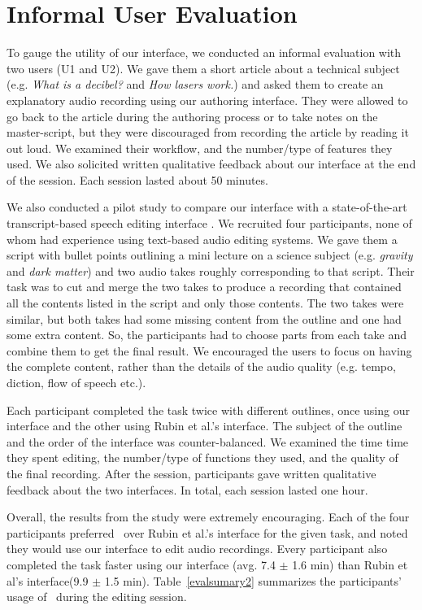 \section{Informal User Evaluation}
To gauge the utility of our interface, we conducted an informal evaluation with two users (U1 and U2). We gave them a short article about a technical subject (e.g. \textit{What is a decibel?} and \textit{How lasers work.}) and asked them to create an explanatory audio recording using our authoring interface. They were allowed to go back to the article during the authoring process or to take notes on the master-script, but they were discouraged from recording the article by reading it out loud. We examined their workflow, and the number/type of features they used. We also solicited written qualitative feedback about our interface at the end of the session. Each session lasted about 50 minutes.




We also conducted a pilot study to compare our interface with a state-of-the-art transcript-based speech editing interface \cite{rubin2013content}. We recruited four participants, none of whom had experience using text-based audio editing systems. We gave them a script with bullet points outlining a mini lecture on a science subject (e.g. \textit{gravity} and \textit{dark matter}) and two audio takes roughly corresponding to that script. Their task was to cut and merge the two takes to produce a recording that contained all the contents listed in the script and only those contents. The two takes were similar, but both takes had some
missing content from the outline and one had some extra
content. So, the participants had to choose parts from each take and combine them to get the final result. We encouraged the users to focus on having the complete content, rather than the details of the audio quality (e.g. tempo, diction, flow of speech etc.). 

Each participant completed the task twice with different outlines, once using our interface and the other using Rubin et al.'s interface. The subject of the outline and the order of the interface was counter-balanced. We examined the time time they spent editing, the number/type of functions they used, and the quality of the final recording. After the session, participants gave written qualitative feedback about the two interfaces. In total, each session lasted one hour.
   
Overall, the results from the study were extremely encouraging. Each of the four participants preferred \systemname\ over Rubin et al.'s interface for the given task, and noted they would use our interface to edit audio recordings. Every participant also completed the task faster using our interface (avg. 7.4 $\pm$ 1.6 min) than Rubin et al's interface(9.9 $\pm$ 1.5 min). Table~\ref{evalsumary2} summarizes the participants' usage of \systemname\ during the editing session.


